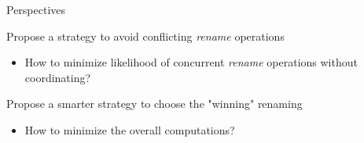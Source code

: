 \documentclass[10pt]{beamer}
\begin{document}
\begin{frame}{Perspectives}
  \begin{block}{Propose a strategy to avoid conflicting \emph{rename} operations}
    \begin{itemize}
      \item How to minimize likelihood of concurrent \emph{rename} operations without coordinating?
    \end{itemize}
  \end{block}

  \pause

  \begin{block}{Propose a smarter strategy to choose the "winning" renaming}
    \begin{itemize}
      \item How to minimize the overall computations?
    \end{itemize}
  \end{block}
\end{frame}
\end{document}

